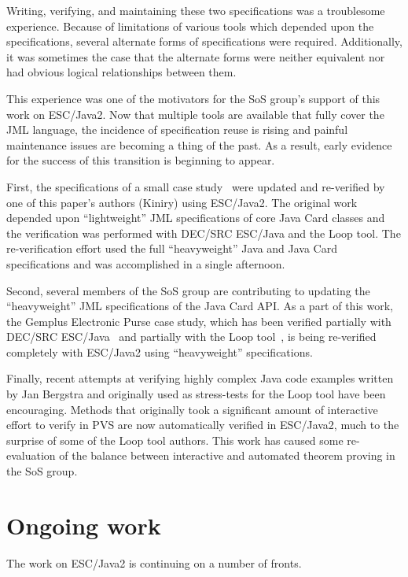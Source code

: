 \documentclass{sig-alternate}
\begin{document}
Writing, verifying, and maintaining these two specifications was a
troublesome experience.  Because of limitations of various tools which
depended upon the specifications, several alternate forms of
specifications were required.  Additionally, it was sometimes the case
that the alternate forms were neither equivalent nor had obvious
logical relationships between them.

This experience was one of the motivators for the SoS group's support
of this work on ESC/Java2.  Now that multiple tools are available that
fully cover the JML language, the incidence of specification reuse is
rising and painful maintenance issues are becoming a thing of the
past.  As a result, early evidence for the success of this transition is
beginning to appear.

First, the specifications of a small case
study~\cite{BreunesseJacobsBerg02} were updated and re-verified by one
of this paper's authors (Kiniry) using ESC/Java2.  The original work
depended upon ``light\-weight'' JML specifications of core Java Card classes
and the verification was performed with DEC/SRC ESC/Java and the Loop
tool.  The re-verification effort used the full ``heavyweight'' Java
and Java Card specifications and was accomplished in a single
afternoon.

Second, several members of the SoS group are contributing to updating
the ``heavyweight'' JML specifications of the Java Card API.  As a
part of this work, the Gemplus Electronic Purse case study, which has
been verified partially with DEC/SRC ESC/Java~\cite{CatanoHuisman02}
and partially with the Loop tool~\cite{BreunesseJacobsBerg02}, is being
re-verified completely with ESC/Java2 using ``heavyweight''
specifications.

Finally, recent attempts at verifying highly complex Java code
examples written by Jan Bergstra and originally used as stress-tests
for the Loop tool have been encouraging.  Methods that originally took
a significant amount of interactive effort to verify in PVS are now
automatically verified in ESC/Java2, much to the surprise of some of
the Loop tool authors.  This work has caused some re-evaluation of the
balance between interactive and automated theorem proving in the SoS
group.

\section{Ongoing work}
The work on ESC/Java2 is continuing on a number of fronts.
\end{document}
